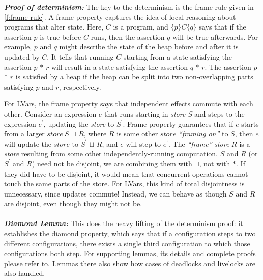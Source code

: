 \documentclass[twocolumn]{article}
\begin{document}
\textbf{\textit{Proof of determinism:}} The key to the determinism is the frame rule given in \ref{f:frame-rule}. A frame property captures the idea of local reasoning about programs that alter state\cite{lindsey}. Here, $C$ is a program, and $\{p\} C \{q\}$ says that if the assertion $p$ is true before $C$ runs, then the assertion $q$ will be true afterwards. For example, $p$ and $q$  might describe the state of the heap before and after it is updated by $C$. It tells that running $C$ starting from a state satisfying the assertion $p$ $\ast$ $r$ will result in a state satisfying the assertion $q$ $\ast$ $r$. The assertion $p$ $\ast$ $r$ is satisfied by a heap if the heap can be split into two non-overlapping parts satisfying $p$ and $r$, respectively.

For LVars, the frame property says that independent effects commute with each other. Consider an expression $e$ that runs starting in \emph{store S} and steps to the expression $e^{'}$, updating the \emph{store} to $S^{'}$. Frame property guarantees that if $e$ starts from a larger $store\ S$ $\sqcup$ $R$, where $R$ is some other $store$ \emph{“framing on”} to $S$, then $e$  will update the $store$ to $S^{′}$ $\sqcup$ $R$, and $e$ will step to $e^{′}$. The \emph{“frame”} \emph{store} $R$  is a \emph{store} resulting from some other independently-running computation. $S$ and $R$ (or $S^{′}$ and $R$) need not be disjoint, we are combining them with $\sqcup$, not with $\ast$. If they did have to be disjoint, it would mean that concurrent operations cannot touch the same parts of the store. For LVars, this kind of total disjointness is unnecessary, since updates commute! Instead, we can behave as though $S$ and $R$ are disjoint, even though they might not be. \\ \\
\textbf{\textit{Diamond Lemma:}} This does the heavy lifting of the determinism proof: it establishes the diamond property, which says that if a configuration steps to two different configurations, there exists a single third configuration to which those configurations both step. For supporting lemmas, its details and complete proofs please refer to\cite{lkuper}. Lemmas there also show how cases of deadlocks and livelocks are also handled.
\end{document}

